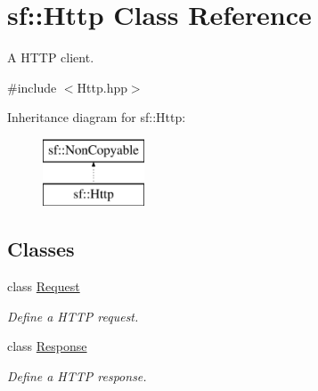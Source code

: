 \hypertarget{classsf_1_1_http}{}\section{sf\+:\+:Http Class Reference}
\label{classsf_1_1_http}


A H\+T\+TP client.  




{\ttfamily \#include $<$Http.\+hpp$>$}

Inheritance diagram for sf\+:\+:Http\+:\begin{figure}[H]
\begin{center}
\leavevmode
\includegraphics[height=2.000000cm]{classsf_1_1_http}
\end{center}
\end{figure}
\subsection*{Classes}
\begin{DoxyCompactItemize}
\item 
class \hyperlink{classsf_1_1_http_1_1_request}{Request}
\begin{DoxyCompactList}\small\item\em Define a H\+T\+TP request. \end{DoxyCompactList}\item 
class \hyperlink{classsf_1_1_http_1_1_response}{Response}
\begin{DoxyCompactList}\small\item\em Define a H\+T\+TP response. \end{DoxyCompactList}\end{DoxyCompactItemize}
